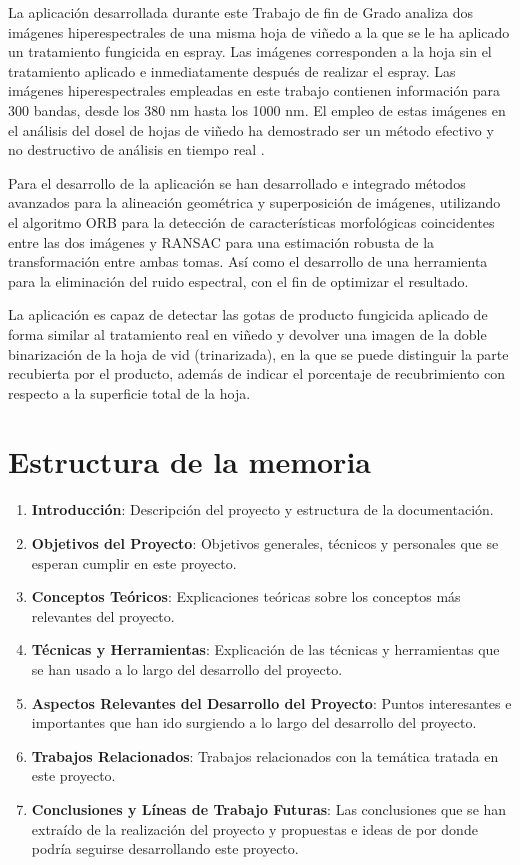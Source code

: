 
La aplicación desarrollada durante este Trabajo de fin de Grado analiza dos imágenes hiperespectrales de una misma hoja de viñedo a la que se le ha aplicado un tratamiento fungicida en espray. Las imágenes corresponden a la hoja sin el tratamiento aplicado e inmediatamente después de realizar el espray.
Las imágenes hiperespectrales empleadas en este trabajo contienen información para 300 bandas, desde los 380 nm hasta los 1000 nm. El empleo de estas imágenes en el análisis del dosel de hojas de viñedo ha demostrado ser un método efectivo y no destructivo de análisis en tiempo real \cite{Tosin2021, DiGennaro2022}.

Para el desarrollo de la aplicación se han desarrollado e integrado métodos avanzados para la alineación geométrica y superposición de imágenes, utilizando el algoritmo ORB para la detección de características morfológicas coincidentes entre las dos imágenes y RANSAC para una estimación robusta de la transformación entre ambas tomas. Así como el desarrollo de una herramienta para la eliminación del ruido espectral, con el fin de optimizar el resultado.

La aplicación es capaz de detectar las gotas de producto fungicida aplicado de forma similar al tratamiento real en viñedo y devolver una imagen de la doble binarización de la hoja de vid (trinarizada), en la que se puede distinguir la parte recubierta por el producto, además de indicar el porcentaje de recubrimiento con respecto a la superficie total de la hoja.




\section{Estructura de la memoria}
\begin{enumerate}
    \item \textbf{Introducción}: Descripción del proyecto y estructura de la documentación.
    \item \textbf{Objetivos del Proyecto}: Objetivos generales, técnicos y personales que se esperan cumplir en este proyecto.
    \item \textbf{Conceptos Teóricos}: Explicaciones teóricas sobre los conceptos más relevantes del proyecto.
    \item \textbf{Técnicas y Herramientas}: Explicación de las técnicas y herramientas que se han usado a lo largo del desarrollo del proyecto.
    \item \textbf{Aspectos Relevantes del Desarrollo del Proyecto}: Puntos interesantes e importantes que han ido surgiendo a lo largo del desarrollo del proyecto.
    \item \textbf{Trabajos Relacionados}: Trabajos relacionados con la temática tratada en este proyecto.
    \item \textbf{Conclusiones y Líneas de Trabajo Futuras}: Las conclusiones que se han extraído de la realización del proyecto y propuestas e ideas de por donde podría seguirse desarrollando este proyecto.
\end{enumerate}


